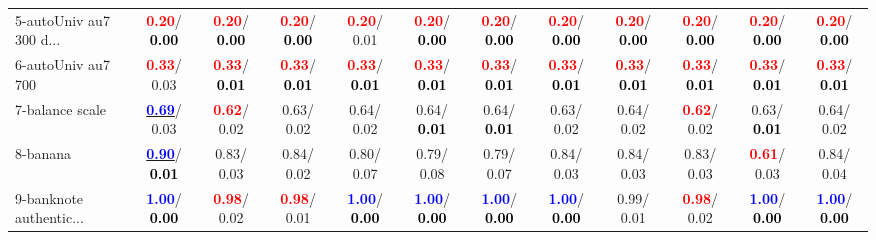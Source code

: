 \begin{table}[h]
\begin{center}
{\begin{tabular}{lc|c|c|c|c|c|c|c|c|c|c}
5-autoUniv au7 300 d... & \textcolor{red}{\textbf{  0.20}}/\textcolor{black}{\textbf{  0.00}} & \textcolor{red}{\textbf{  0.20}}/\textcolor{black}{\textbf{  0.00}} & \textcolor{red}{\textbf{  0.20}}/\textcolor{black}{\textbf{  0.00}} & \textcolor{red}{\textbf{  0.20}}/  0.01 & \textcolor{red}{\textbf{  0.20}}/\textcolor{black}{\textbf{  0.00}} & \textcolor{red}{\textbf{  0.20}}/\textcolor{black}{\textbf{  0.00}} & \textcolor{red}{\textbf{  0.20}}/\textcolor{black}{\textbf{  0.00}} & \textcolor{red}{\textbf{  0.20}}/\textcolor{black}{\textbf{  0.00}} & \textcolor{red}{\textbf{  0.20}}/\textcolor{black}{\textbf{  0.00}} & \textcolor{red}{\textbf{  0.20}}/\textcolor{black}{\textbf{  0.00}} & \textcolor{red}{\textbf{  0.20}}/\textcolor{black}{\textbf{  0.00}} \\
6-autoUniv au7 700 & \textcolor{red}{\textbf{  0.33}}/  0.03 & \textcolor{red}{\textbf{  0.33}}/\textcolor{black}{\textbf{  0.01}} & \textcolor{red}{\textbf{  0.33}}/\textcolor{black}{\textbf{  0.01}} & \textcolor{red}{\textbf{  0.33}}/\textcolor{black}{\textbf{  0.01}} & \textcolor{red}{\textbf{  0.33}}/\textcolor{black}{\textbf{  0.01}} & \textcolor{red}{\textbf{  0.33}}/\textcolor{black}{\textbf{  0.01}} & \textcolor{red}{\textbf{  0.33}}/\textcolor{black}{\textbf{  0.01}} & \textcolor{red}{\textbf{  0.33}}/\textcolor{black}{\textbf{  0.01}} & \textcolor{red}{\textbf{  0.33}}/\textcolor{black}{\textbf{  0.01}} & \textcolor{red}{\textbf{  0.33}}/\textcolor{black}{\textbf{  0.01}} & \textcolor{red}{\textbf{  0.33}}/\textcolor{black}{\textbf{  0.01}} \\
7-balance scale & \underline{\textcolor{blue}{\textbf{  0.69}}}/  0.03 & \textcolor{red}{\textbf{  0.62}}/  0.02 &   0.63/  0.02 &   0.64/  0.02 &   0.64/\textcolor{black}{\textbf{  0.01}} &   0.64/\textcolor{black}{\textbf{  0.01}} &   0.63/  0.02 &   0.64/  0.02 & \textcolor{red}{\textbf{  0.62}}/  0.02 &   0.63/\textcolor{black}{\textbf{  0.01}} &   0.64/  0.02 \\ \hline
8-banana & \underline{\textcolor{blue}{\textbf{  0.90}}}/\textcolor{black}{\textbf{  0.01}} &   0.83/  0.03 &   0.84/  0.02 &   0.80/  0.07 &   0.79/  0.08 &   0.79/  0.07 &   0.84/  0.03 &   0.84/  0.03 &   0.83/  0.03 & \textcolor{red}{\textbf{  0.61}}/  0.03 &   0.84/  0.04 \\
9-banknote authentic... & \textcolor{blue}{\textbf{  1.00}}/\textcolor{black}{\textbf{  0.00}} & \textcolor{red}{\textbf{  0.98}}/  0.02 & \textcolor{red}{\textbf{  0.98}}/  0.01 & \textcolor{blue}{\textbf{  1.00}}/\textcolor{black}{\textbf{  0.00}} & \textcolor{blue}{\textbf{  1.00}}/\textcolor{black}{\textbf{  0.00}} & \textcolor{blue}{\textbf{  1.00}}/\textcolor{black}{\textbf{  0.00}} & \textcolor{blue}{\textbf{  1.00}}/\textcolor{black}{\textbf{  0.00}} &   0.99/  0.01 & \textcolor{red}{\textbf{  0.98}}/  0.02 & \textcolor{blue}{\textbf{  1.00}}/\textcolor{black}{\textbf{  0.00}} & \textcolor{blue}{\textbf{  1.00}}/\textcolor{black}{\textbf{  0.00}} \\

\end{tabular}}
\end{center}
\end{table}
